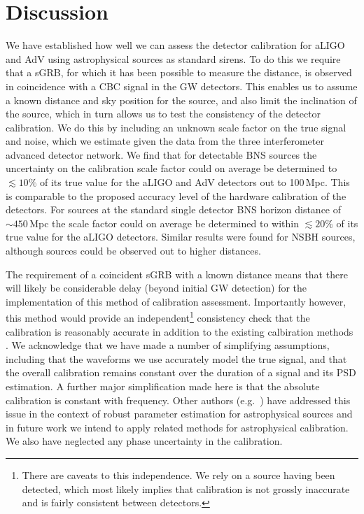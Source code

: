 \documentclass[prd, twocolumn, lengthcheck, superscriptaddress, showpacs, letterpaper, nofootinbib]{revtex4-1}
\begin{document}
\section{Discussion\label{sec:discussion}}

We have established how well we can assess the detector calibration for
\ac{aLIGO} and \ac{AdV} using astrophysical sources as standard sirens. To do
this we require that a \ac{sGRB}, for which it has been possible to measure the
distance, is observed in coincidence with a \ac{CBC} signal in the \ac{GW}
detectors. This enables us to assume a known distance and sky position for the
source, and also limit the inclination of the source, which in turn allows us
to test the consistency of the detector calibration. We do this by including an
unknown scale factor on the true signal and noise, which we estimate given the
data from the three interferometer advanced detector network. We find that for
detectable \ac{BNS} sources the uncertainty on the calibration scale factor
could on average be determined to $\lesssim 10\%$ of its true value for the
\ac{aLIGO} and \ac{AdV} detectors out to 100\,Mpc. This is comparable to the
proposed accuracy level of the hardware calibration of the detectors. For
sources at the standard single detector \ac{BNS} horizon distance of $\sim
450$\,Mpc the scale factor could on average be determined to within $\lesssim
20\%$ of its true value for the \ac{aLIGO} detectors. Similar results were
found for \ac{NSBH} sources, although sources could be observed out to higher
distances.

The requirement of a coincident \ac{sGRB} with a known distance means that
there will likely be considerable delay (beyond initial \ac{GW} detection) for
the implementation of this method of calibration assessment.  Importantly
however, this method would provide an independent\footnote{There are caveats to this independence. 
We rely on a source having been detected, which most likely implies that calibration is not grossly 
inaccurate and is fairly consistent between detectors.} consistency check that the calibration is 
reasonably accurate in addition to the existing calbiration methods \cite{2010NIMPA.624..223A}.  We acknowledge that we have made a number of simplifying assumptions, 
including that the waveforms we use accurately model the true signal, and that the overall 
calibration remains constant over the duration of a signal and its \ac{PSD} estimation. A further
major simplification made here is that the absolute calibration is constant
with frequency. Other authors (e.g.\ \cite{Vitale:2012,2013PhRvD..88h4044L}) have addressed
this issue in the context of robust parameter estimation for astrophysical
sources and in future work we intend to apply related methods for astrophysical
calibration.  We also have neglected any phase uncertainty in the calibration.
\end{document}
